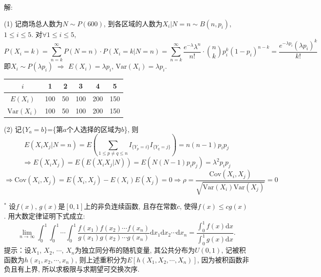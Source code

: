 \documentclass[standard]{ExBook}
\begin{document}
\begin{qitems}
\vspace{-5em}

    \begin{bbox}
解: 

(1) 记商场总人数为$N\sim P(600)$, 到各区域的人数为$X_i|N=n\sim B(n,p_i)$, $1\leq i\leq 5$. 对$\forall 1\leq i\leq 5$,
$$\displaystyle P(X_i=k)=\sum\limits_{n=k}^{\infty}P(N=n)\cdot P(X_i=k|N=n)=\sum\limits_{n=k}^{\infty}\frac{e^{-\lambda}\lambda^n}{n!}\cdot \binom{n}{k}p_i^k(1-p_i)^{n-k}=\frac{e^{-\lambda p_i}(\lambda p_i)^k}{k!}$$
即$X_i\sim P(\lambda p_i)$ $\Longrightarrow$ $E(X_i)=\lambda p_i$, $\mathrm{Var}(X_i)=\lambda p_i$.

\vspace{0.5em}
\setlength{\tabcolsep}{1.75em}
\begin{minipage}[c]{1\textwidth}
\centering
\begin{tabular}{c|c|c|c|c|c}
    $i$ & 1 & 2 & 3 & 4 & 5\\
    \hline
    $E(X_i)$ & 100 & 50 & 100 & 200 & 150\\
    \hline
    $\mathrm{Var}(X_i)$ & 100 & 50 & 100 & 200 & 150
\end{tabular}
\end{minipage}

(2) 记$\{Y_{a}=b\}$=\{第$a$个人选择的区域为$b$\}, 则
$$\displaystyle E(X_i X_j|N=n)=E\left(\sum\limits_{1\leq p\neq q\leq n}I_{\{Y_p=i\}}I_{\{Y_q=j\}}\right)=n(n-1)p_i p_j$$
$$\Longrightarrow E(X_i X_j)=E(E(X_i X_j|N))=E(N(N-1)p_i p_j)=\lambda^2 p_i p_j$$
$$\displaystyle \Longrightarrow \mathrm{Cov}(X_i,X_j)=E(X_i,X_j)-E(X_i)E(X_j)=0 \Longrightarrow \rho=\frac{\mathrm{Cov}(X_i,X_j)}{\sqrt{\mathrm{Var}(X_i)\mathrm{Var}(X_j)}}=0$$
    \end{bbox}

\vspace{-5em}

    \begin{bbox}
    \begin{shaded}
        \qitem$^{*}$
设$f(x)$, $g(x)$是$[0,1]$上的非负连续函数, 且存在常数$c$, 使得$f(x)\leq c g(x)$. 用大数定律证明下式成立:
$$\lim\limits_{n\to\infty}\displaystyle\int_{0}^{1}\int_{0}^{1}\cdots\int_{0}^{1}\frac{f(x_1)f(x_2)\cdots f(x_n)}{g(x_1)g(x_2)\cdots g(x_n)}\mathrm{d}x_1\mathrm{d}x_2\cdots\mathrm{d}x_n=\frac{\int_{0}^{1}f(x)\mathrm{d}x}{\int_{0}^{1}g(x)\mathrm{d}x}.$$
提示：设$X_1$, $X_2$, $\cdots$, $X_n$为独立同分布的随机变量, 其公共分布为$U(0,1)$, 记被积函数为$h(x_1,x_2,\cdots,x_n)$, 则上述重积分为$E[h(X_1,X_2,\cdots,X_n)]$, 因为被积函数非负且有上界, 所以求极限与求期望可交换次序.
    \end{shaded}
    \end{bbox}


\end{qitems}
\end{document}
